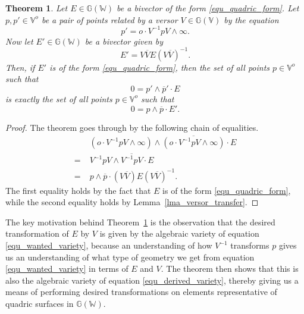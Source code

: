\documentclass{birkjour}
\newtheorem{thm}{Theorem}[section]
\theoremstyle{definition}
\theoremstyle{remark}
\numberwithin{equation}{section}
\newcommand{\G}{\mathbb{G}}
\newcommand{\V}{\mathbb{V}}
\newcommand{\W}{\mathbb{W}}
\newcommand{\nvao}{o}
\newcommand{\nvai}{\infty}
\begin{document}
\begin{thm}\label{thm_quadric_transform}
Let $E\in\G(\W)$ be a bivector of the form \eqref{equ_quadric_form}.
Let $p,p'\in\V^o$ be a pair of points related by a versor $V\in\G(\V)$ by
the equation
\begin{equation}\label{equ_get_rid_ni}
p' = \nvao\cdot V^{-1}pV\wedge\nvai.
\end{equation}
Now let $E'\in\G(\W)$ be a bivector given by
\begin{equation}\label{equ_transformed_surface}
E' = V\overline{V}E(V\overline{V})^{-1}.
\end{equation}
Then, if $E'$ is of the form \eqref{equ_quadric_form}, then the
set of all points $p\in\V^\nvao$ such that
\begin{equation}\label{equ_wanted_variety}
0 = p'\wedge\overline{p}'\cdot E
\end{equation}
is exactly the set of all points $p\in\V^\nvao$ such that
\begin{equation}\label{equ_derived_variety}
0 = p\wedge\overline{p}\cdot E'.
\end{equation}
\end{thm}
\begin{proof}
The theorem goes through by the following chain of equalities.
\begin{align}
 & (\nvao\cdot V^{-1}pV\wedge\nvai)\wedge\overline{(\nvao\cdot V^{-1}pV\wedge\nvai)}\cdot E \\
=\;& V^{-1}pV\wedge\overline{V^{-1}pV}\cdot E \\
=\;& p\wedge\overline{p}\cdot(V\overline{V})E(V\overline{V})^{-1}.
\end{align}
The first equality holds by the fact that $E$ is of the form \eqref{equ_quadric_form},
while the second equality holds by Lemma~\ref{lma_versor_transfer}.
\end{proof}

The key motivation behind Theorem~\ref{thm_quadric_transform} is
the observation that the desired transformation of $E$ by $V$ is
given by the algebraic variety of equation \eqref{equ_wanted_variety}, because
an understanding of how $V^{-1}$ transforms $p$ gives us an understanding
of what type of geometry we get from equation \eqref{equ_wanted_variety} in terms of $E$ and $V$.
The theorem then
shows that this is also the algebraic variety of equation \eqref{equ_derived_variety}, thereby
giving us a means of performing desired transformations on elements representative
of quadric surfaces in $\G(\W)$.
\end{document}
